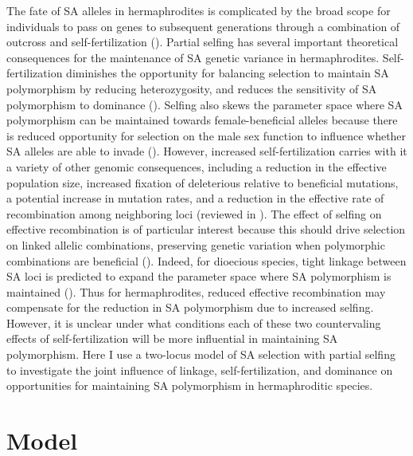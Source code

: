 \documentclass{article}
\begin{document}
The fate of SA alleles in hermaphrodites is complicated by the broad scope for individuals to pass on genes to subsequent generations through a combination of outcross and self-fertilization (\citealt{Goodwillie2005, JarneAuld2006, JordanConn2014}). Partial selfing has several important theoretical consequences for the maintenance of SA genetic variance in hermaphrodites. Self-fertilization diminishes the opportunity for balancing selection to maintain SA polymorphism by reducing heterozygosity, and reduces the sensitivity of SA polymorphism to dominance (\citealt{JordanConn2014,Tazzyman2015}). Selfing also skews the parameter space where SA polymorphism can be maintained towards female-beneficial alleles because there is reduced opportunity for selection on the male sex function to influence whether SA alleles are able to invade (\citealt{JordanConn2014}). However, increased self-fertilization carries with it a variety of other genomic consequences, including a reduction in the effective population size, increased fixation of deleterious relative to beneficial mutations, a potential increase in mutation rates, and a reduction in the effective rate of recombination among neighboring loci (reviewed in \citealt{Wright2008}). The effect of selfing on effective recombination is of particular interest because this should drive selection on linked allelic combinations, preserving genetic variation when polymorphic combinations are beneficial (\citealt{CITE}). Indeed, for dioecious species, tight linkage between SA loci is predicted to expand the parameter space where SA polymorphism is maintained (\citealt{Patten2010}). Thus for hermaphrodites, reduced effective recombination may compensate for the reduction in SA polymorphism due to increased selfing. However, it is unclear under what conditions each of these two countervaling effects of self-fertilization will be more influential in maintaining SA polymorphism. Here I use a two-locus model of SA selection with partial selfing to investigate the joint influence of linkage, self-fertilization, and dominance on opportunities for maintaining SA polymorphism in hermaphroditic species. 


\section*{Model}
\end{document}
